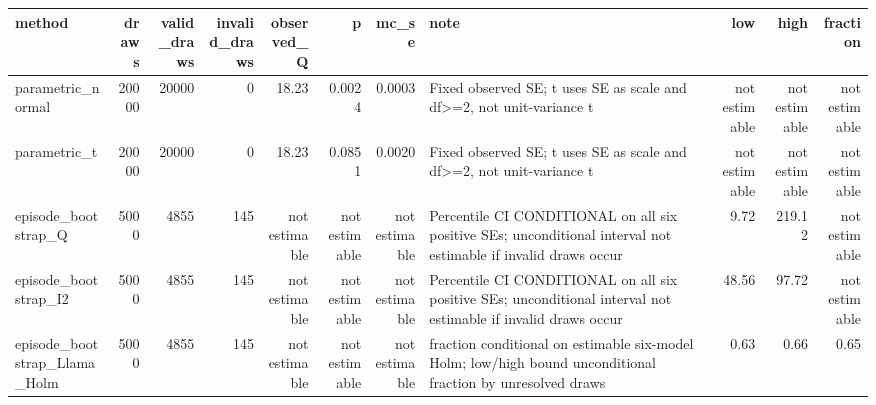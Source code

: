 \begin{tabular}{lrrrrrrlrrr}
\toprule
method & draws & valid\_draws & invalid\_draws & observed\_Q & p & mc\_se & note & low & high & fraction \\
\midrule
parametric\_normal & 20000 & 20000 & 0 & 18.23 & 0.0024 & 0.0003 & Fixed observed SE; t uses SE as scale and df>=2, not unit-variance t & not estimable & not estimable & not estimable \\
parametric\_t & 20000 & 20000 & 0 & 18.23 & 0.0851 & 0.0020 & Fixed observed SE; t uses SE as scale and df>=2, not unit-variance t & not estimable & not estimable & not estimable \\
episode\_bootstrap\_Q & 5000 & 4855 & 145 & not estimable & not estimable & not estimable & Percentile CI CONDITIONAL on all six positive SEs; unconditional interval not estimable if invalid draws occur & 9.72 & 219.12 & not estimable \\
episode\_bootstrap\_I2 & 5000 & 4855 & 145 & not estimable & not estimable & not estimable & Percentile CI CONDITIONAL on all six positive SEs; unconditional interval not estimable if invalid draws occur & 48.56 & 97.72 & not estimable \\
episode\_bootstrap\_Llama\_Holm & 5000 & 4855 & 145 & not estimable & not estimable & not estimable & fraction conditional on estimable six-model Holm; low/high bound unconditional fraction by unresolved draws & 0.63 & 0.66 & 0.65 \\
\bottomrule
\end{tabular}
